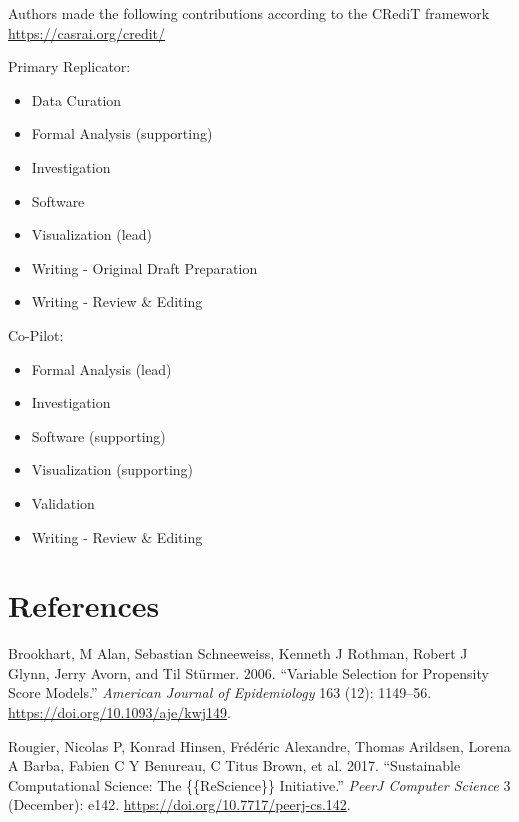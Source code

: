 \documentclass[10,a4paperpaper,]{article}
\newenvironment{CSLReferences}%
  {}%
  {\par}
\begin{document}
Authors made the following contributions according to the CRediT
framework \url{https://casrai.org/credit/}

Primary Replicator:

\begin{itemize}
\tightlist
\item
  Data Curation\\
\item
  Formal Analysis (supporting)\\
\item
  Investigation\\
\item
  Software\\
\item
  Visualization (lead)\\
\item
  Writing - Original Draft Preparation\\
\item
  Writing - Review \& Editing
\end{itemize}

Co-Pilot:

\begin{itemize}
\tightlist
\item
  Formal Analysis (lead)\\
\item
  Investigation\\
\item
  Software (supporting)\\
\item
  Visualization (supporting)\\
\item
  Validation\\
\item
  Writing - Review \& Editing
\end{itemize}

\newpage

\section*{References}
\begingroup
\hphantom{x}
\setlength{\parindent}{-0.5in}
\setlength{\leftskip}{0.5in}

\hypertarget{refs}{}
\begin{CSLReferences}{1}{0}
\leavevmode\hypertarget{ref-Brookhart2006}{}%
Brookhart, M Alan, Sebastian Schneeweiss, Kenneth J Rothman, Robert J
Glynn, Jerry Avorn, and Til Stürmer. 2006. {``{Variable Selection for
Propensity Score Models}.''} \emph{American Journal of Epidemiology} 163
(12): 1149--56. \url{https://doi.org/10.1093/aje/kwj149}.

\leavevmode\hypertarget{ref-rougier_sustainable_2017-1}{}%
Rougier, Nicolas P, Konrad Hinsen, Frédéric Alexandre, Thomas Arildsen,
Lorena A Barba, Fabien C Y Benureau, C Titus Brown, et al. 2017.
{``{Sustainable Computational Science: The {\{}{\{}ReScience{\}}{\}}
Initiative}.''} \emph{PeerJ Computer Science} 3 (December): e142.
\url{https://doi.org/10.7717/peerj-cs.142}.

\end{CSLReferences}
\end{document}

